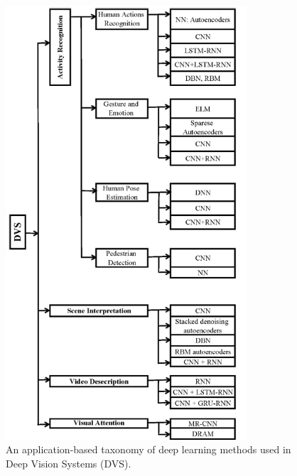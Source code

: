 \begin{figure}[H]
    \centering
    \includegraphics[width=0.8\textwidth]{archivos/figuras/dvs.jpg} 
    \caption{An application-based taxonomy of deep learning methods used in Deep Vision Systems (DVS).}
    \label{fig:taxonomy}
\end{figure}

